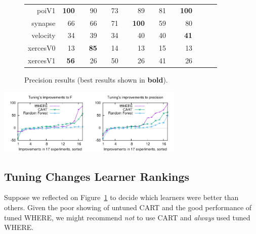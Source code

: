\documentclass{sig-alternative}
\newcommand{\rone}{}
\newcommand{\rtwo}{}
\newcommand{\rthree}{}
\newcommand{\rfour}{}
\newcommand{\fig}[1]{Figure~\ref{fig:#1}}
\begin{document}
\begin{figure}[!h]
\begin{tabular}{r|rl|rl|rl|rl|rl|rlrl}
poiV1 & {\bf  100} & {\rfour} & 90 & {\rthree} & 73 &         & 89 & {\rtwo} & 81 & {\rone} & {\bf 100} & {\rfour}\\
synapse & 66 &         & 66 &         & 71 & {\rone} & {\bf 100} & {\rfour} & 59 &         & 80 & {\rtwo}\\
velocity & 34 &         & 39 & {\rthree} & 34 &         & 40 & {\rfour} & 40 & {\rfour} & {\bf 41} & {\rfour}\\
xercesV0 & 13 &         & {\bf 85} & {\rfour} & 14 &         & 13 &         & 15 &         & 13 &        \\
xercesV1 & {\bf 56} & {\rfour} & 26 &         & 50 & {\rthree} & 26 &         & 41 & {\rtwo} & 26 &        \\
\end{tabular}
\caption{Precision results (best results  shown in {\bf bold}).}
\label{fig:precisionbars}
\end{figure}

\includegraphics[width=1.75in]{F.pdf}\includegraphics[width=1.75in]{precision.pdf}

 
\subsection{Tuning Changes Learner Rankings}\label{sect:rank}

Suppose we reflected on \fig{precisionbars} to decide which learners were better than others.
Given the poor showing of untuned CART and the good performance of tuned WHERE, we might recommend
{\em not} to use CART and {\em always} used tuned WHERE.
\end{document}
